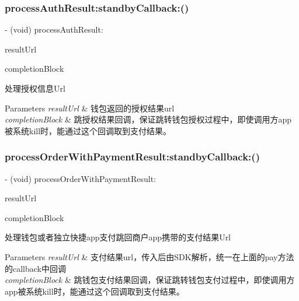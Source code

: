 \subsubsection{\texorpdfstring{process\+Auth\+Result\+:standby\+Callback\+:()}{processAuthResult:standbyCallback:()}}
{\footnotesize\ttfamily -\/ (void) process\+Auth\+Result\+: \begin{DoxyParamCaption}\item[{(N\+S\+U\+RL $\ast$)}]{result\+Url }\item[{standbyCallback:(Completion\+Block)}]{completion\+Block }\end{DoxyParamCaption}}

处理授权信息\+Url


\begin{DoxyParams}{Parameters}
{\em result\+Url} & 钱包返回的授权结果url \\
\hline
{\em completion\+Block} & 跳授权结果回调，保证跳转钱包授权过程中，即使调用方app被系统kill时，能通过这个回调取到支付结果。 \\
\hline
\end{DoxyParams}
\mbox{\label{interface_alipay_s_d_k_a00d830efbcfdc889493db7e4e5b280b2}} 
\subsubsection{\texorpdfstring{process\+Order\+With\+Payment\+Result\+:standby\+Callback\+:()}{processOrderWithPaymentResult:standbyCallback:()}}
{\footnotesize\ttfamily -\/ (void) process\+Order\+With\+Payment\+Result\+: \begin{DoxyParamCaption}\item[{(N\+S\+U\+RL $\ast$)}]{result\+Url }\item[{standbyCallback:(Completion\+Block)}]{completion\+Block }\end{DoxyParamCaption}}

处理钱包或者独立快捷app支付跳回商户app携带的支付结果\+Url


\begin{DoxyParams}{Parameters}
{\em result\+Url} & 支付结果url，传入后由\+S\+D\+K解析，统一在上面的pay方法的callback中回调 \\
\hline
{\em completion\+Block} & 跳钱包支付结果回调，保证跳转钱包支付过程中，即使调用方app被系统kill时，能通过这个回调取到支付结果。 \\
\hline
\end{DoxyParams}
\mbox{\label{interface_alipay_s_d_k_a3397bb35d1eda5051f5081d5841f2d32}} 
